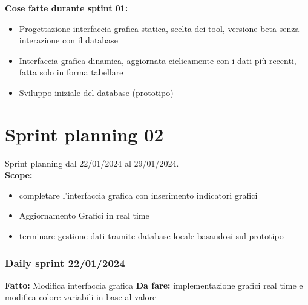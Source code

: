 \documentclass{report}
\begin{document}
\textbf{Cose fatte durante sptint 01:}
\begin{itemize}
\item Progettazione interfaccia grafica statica, scelta dei tool, versione beta senza interazione con il database
\item Interfaccia grafica dinamica, aggiornata ciclicamente con i dati più recenti, fatta solo in forma tabellare
\item Sviluppo iniziale del database (prototipo)
\end{itemize}

\chapter{Sprint planning 02}
Sprint planning dal 22/01/2024 al 29/01/2024.\\

\textbf{Scope:}
\begin{itemize}
\item completare l'interfaccia grafica con inserimento indicatori grafici
\item Aggiornamento Grafici in real time 
\item terminare gestione dati tramite database locale basandosi sul prototipo
\end{itemize}

\subsection{Daily sprint 22/01/2024}
\textbf{Fatto:} Modifica interfaccia grafica 
\textbf{Da fare:} implementazione grafici real time e modifica colore variabili in base al valore
\end{document}

